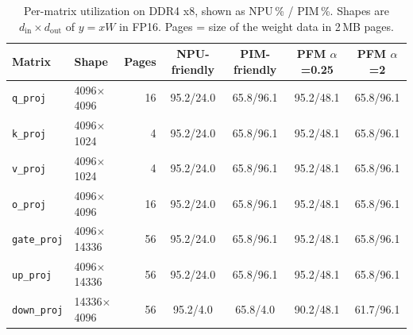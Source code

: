 \begin{table}[t]
\centering
\caption{Per-matrix utilization on DDR4 x8, shown as NPU\,\% / PIM\,\%. Shapes are $d_{\mathrm{in}}\times d_{\mathrm{out}}$ of $y = xW$ in FP16. Pages = size of the weight data in 2\,MB pages.}
\label{tab:shapes}
\begin{tabular}{llrcccc}
\toprule
Matrix & Shape & Pages & NPU-friendly & PIM-friendly & PFM $\alpha$=0.25 & PFM $\alpha$=2 \\
\midrule
\texttt{q\_proj} & 4096$\times$4096 & 16 & 95.2/24.0 & 65.8/96.1 & 95.2/48.1 & 65.8/96.1 \\
\texttt{k\_proj} & 4096$\times$1024 & 4 & 95.2/24.0 & 65.8/96.1 & 95.2/48.1 & 65.8/96.1 \\
\texttt{v\_proj} & 4096$\times$1024 & 4 & 95.2/24.0 & 65.8/96.1 & 95.2/48.1 & 65.8/96.1 \\
\texttt{o\_proj} & 4096$\times$4096 & 16 & 95.2/24.0 & 65.8/96.1 & 95.2/48.1 & 65.8/96.1 \\
\texttt{gate\_proj} & 4096$\times$14336 & 56 & 95.2/24.0 & 65.8/96.1 & 95.2/48.1 & 65.8/96.1 \\
\texttt{up\_proj} & 4096$\times$14336 & 56 & 95.2/24.0 & 65.8/96.1 & 95.2/48.1 & 65.8/96.1 \\
\texttt{down\_proj} & 14336$\times$4096 & 56 & 95.2/4.0 & 65.8/4.0 & 90.2/48.1 & 61.7/96.1 \\
\bottomrule
\end{tabular}
\end{table}
